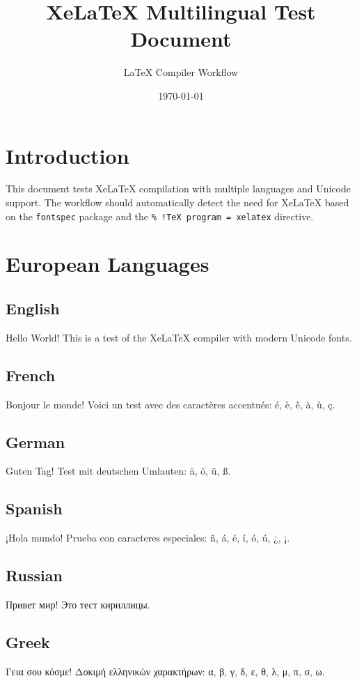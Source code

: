 \documentclass[12pt,a4paper]{article}
\title{XeLaTeX Multilingual Test Document}
\author{LaTeX Compiler Workflow}
\date{\today}
\begin{document}
\maketitle

\section{Introduction}

This document tests XeLaTeX compilation with multiple languages and Unicode support. The workflow should automatically detect the need for XeLaTeX based on the \texttt{fontspec} package and the \texttt{\% !TeX program = xelatex} directive.

\section{European Languages}

\subsection{English}
Hello World! This is a test of the XeLaTeX compiler with modern Unicode fonts.

\subsection{French}
Bonjour le monde! Voici un test avec des caractères accentués: é, è, ê, à, ù, ç.

\subsection{German}
Guten Tag! Test mit deutschen Umlauten: ä, ö, ü, ß.

\subsection{Spanish}
¡Hola mundo! Prueba con caracteres especiales: ñ, á, é, í, ó, ú, ¿, ¡.

\subsection{Russian}
\begin{russian}
Привет мир! Это тест кириллицы.
\end{russian}

\subsection{Greek}
\begin{greek}
Γεια σου κόσμε! Δοκιμή ελληνικών χαρακτήρων: α, β, γ, δ, ε, θ, λ, μ, π, σ, ω.
\end{greek}
\end{document}
